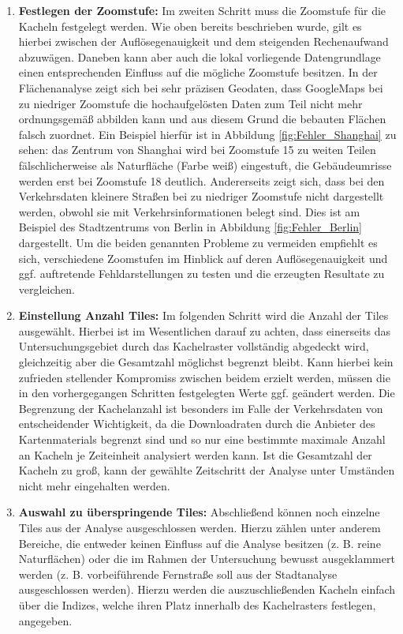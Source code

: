 \begin{enumerate}
\item \textbf{Festlegen der Zoomstufe:} Im zweiten Schritt muss die Zoomstufe für die Kacheln festgelegt werden. Wie oben bereits beschrieben wurde, gilt es hierbei zwischen der Auflösegenauigkeit und dem steigenden Rechenaufwand abzuwägen. Daneben kann aber auch die lokal vorliegende Datengrundlage einen entsprechenden Einfluss auf die mögliche Zoomstufe besitzen. In der Flächenanalyse zeigt sich bei sehr präzisen Geodaten, dass GoogleMaps bei zu niedriger Zoomstufe die hochaufgelösten Daten zum Teil nicht mehr ordnungsgemäß abbilden kann und aus diesem Grund die bebauten Flächen falsch zuordnet. Ein Beispiel hierfür ist in Abbildung \ref{fig:Fehler_Shanghai} zu sehen: das Zentrum von Shanghai wird bei Zoomstufe 15 zu weiten Teilen fälschlicherweise als Naturfläche (Farbe weiß) eingestuft, die Gebäudeumrisse werden erst bei Zoomstufe 18 deutlich. Andererseits zeigt sich, dass bei den Verkehrsdaten kleinere Straßen bei zu niedriger Zoomstufe nicht dargestellt werden, obwohl sie mit Verkehrsinformationen belegt sind. Dies ist am Beispiel des Stadtzentrums von Berlin in Abbildung \ref{fig:Fehler_Berlin} dargestellt. Um die beiden genannten Probleme zu vermeiden empfiehlt es sich, verschiedene Zoomstufen im Hinblick auf deren Auflösegenauigkeit und ggf. auftretende Fehldarstellungen zu testen und die erzeugten Resultate zu vergleichen.

\item \textbf{Einstellung Anzahl Tiles:} Im folgenden Schritt wird die Anzahl der Tiles ausgewählt. Hierbei ist im Wesentlichen darauf zu achten, dass einerseits das Untersuchungsgebiet durch das Kachelraster vollständig abgedeckt wird, gleichzeitig aber die Gesamtzahl möglichst begrenzt bleibt. Kann hierbei kein zufrieden stellender Kompromiss zwischen beidem erzielt werden, müssen die in den vorhergegangen Schritten festgelegten Werte ggf. geändert werden. Die Begrenzung der Kachelanzahl ist besonders im Falle der Verkehrsdaten von entscheidender Wichtigkeit, da die Downloadraten durch die Anbieter des Kartenmaterials begrenzt sind und so nur eine bestimmte maximale Anzahl an Kacheln je Zeiteinheit analysiert werden kann. Ist die Gesamtzahl der Kacheln zu groß, kann der gewählte Zeitschritt der Analyse unter Umständen nicht mehr eingehalten werden.  

\item \textbf{Auswahl zu überspringende Tiles:} Abschließend können noch einzelne Tiles aus der Analyse ausgeschlossen werden. Hierzu zählen unter anderem Bereiche, die entweder keinen Einfluss auf die Analyse besitzen (z. B. reine Naturflächen) oder die im Rahmen der Untersuchung bewusst ausgeklammert werden (z. B. vorbeiführende Fernstraße soll aus der Stadtanalyse ausgeschlossen werden). Hierzu werden die auszuschließenden Kacheln einfach über die Indizes, welche ihren Platz innerhalb des Kachelrasters festlegen, angegeben.
\end{enumerate}
